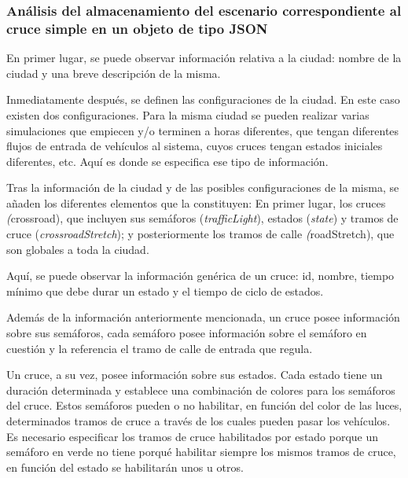 \subsubsection{Análisis del almacenamiento del escenario correspondiente al cruce simple en un objeto de tipo JSON}
En primer lugar, se puede observar información relativa a la ciudad: nombre de la ciudad y una breve descripción de la misma.


Inmediatamente después, se definen las configuraciones de la ciudad. En este caso existen dos configuraciones. 
Para la misma ciudad se pueden realizar varias simulaciones que empiecen y/o terminen a horas diferentes, que tengan diferentes flujos de entrada de vehículos al sistema, cuyos cruces tengan estados iniciales diferentes, etc. Aquí es donde se especifica ese tipo de información.


Tras la información de la ciudad y de las posibles configuraciones de la misma, se añaden los diferentes elementos que la constituyen: En primer lugar, los cruces \textit({crossroad}), que incluyen sus semáforos (\textit{trafficLight}), estados (\textit{state}) y tramos de cruce (\textit{crossroadStretch}); y posteriormente los tramos de calle \textit({roadStretch}), que son globales a toda la ciudad.

Aquí, se puede observar la información genérica de un cruce: id, nombre, tiempo mínimo que debe durar un estado y el tiempo de ciclo de estados.


Además de la información anteriormente mencionada, un cruce posee información sobre sus semáforos, cada semáforo posee información sobre el semáforo en cuestión y la referencia el tramo de calle de entrada que regula.


Un cruce, a su vez, posee información sobre sus estados. Cada estado tiene un duración determinada y establece una combinación de colores para los semáforos del cruce. Estos semáforos pueden o no habilitar, en función del color de las luces, determinados tramos de cruce a través de los cuales pueden pasar los vehículos. Es necesario especificar los tramos de cruce habilitados por estado porque un semáforo en verde no tiene porqué habilitar siempre los mismos tramos de cruce, en función del estado se habilitarán unos u otros.


